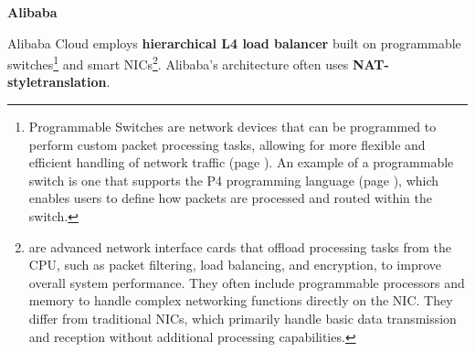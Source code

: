 \highspace
\begin{flushleft}
    \textcolor{Green3}{ \textbf{Alibaba}}
\end{flushleft}
Alibaba Cloud employs \textbf{hierarchical L4 load balancer} built on programmable switches\footnote{
    Programmable Switches are network devices that can be programmed to perform custom packet processing tasks, allowing for more flexible and efficient handling of network traffic (page \pageref{section: Programmable Switches}). An example of a programmable switch is one that supports the P4 programming language (page \pageref{subsection: Data Plane Programming and P4}), which enables users to define how packets are processed and routed within the switch.
} and smart NICs\footnote{
     are advanced network interface cards that offload processing tasks from the CPU, such as packet filtering, load balancing, and encryption, to improve overall system performance. They often include programmable processors and memory to handle complex networking functions directly on the NIC. They differ from traditional NICs, which primarily handle basic data transmission and reception without additional processing capabilities.
}. Alibaba's architecture often uses \textbf{NAT-style\break translation}.

